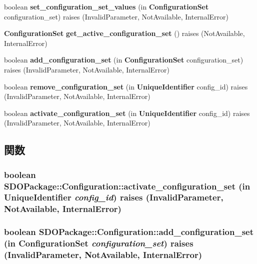 \begin{DoxyCompactItemize}
\item 
boolean {\bf set\_\-configuration\_\-set\_\-values} (in {\bf ConfigurationSet} configuration\_\-set)  raises (InvalidParameter, NotAvailable, InternalError)
\item 
{\bf ConfigurationSet} {\bf get\_\-active\_\-configuration\_\-set} ()  raises (NotAvailable, InternalError)
\item 
boolean {\bf add\_\-configuration\_\-set} (in {\bf ConfigurationSet} configuration\_\-set)  raises (InvalidParameter, NotAvailable, InternalError)
\item 
boolean {\bf remove\_\-configuration\_\-set} (in {\bf UniqueIdentifier} config\_\-id)  raises (InvalidParameter, NotAvailable, InternalError)
\item 
boolean {\bf activate\_\-configuration\_\-set} (in {\bf UniqueIdentifier} config\_\-id)  raises (InvalidParameter, NotAvailable, InternalError)
\end{DoxyCompactItemize}


\subsection{関数}
\subsubsection[{activate\_\-configuration\_\-set}]{\setlength{\rightskip}{0pt plus 5cm}boolean SDOPackage::Configuration::activate\_\-configuration\_\-set (in {\bf UniqueIdentifier} {\em config\_\-id})  raises (InvalidParameter, NotAvailable, InternalError)}\label{interfaceSDOPackage_1_1Configuration_a328e38e1fa5acd4fb27b1a99912a4923}
\subsubsection[{add\_\-configuration\_\-set}]{\setlength{\rightskip}{0pt plus 5cm}boolean SDOPackage::Configuration::add\_\-configuration\_\-set (in {\bf ConfigurationSet} {\em configuration\_\-set})  raises (InvalidParameter, NotAvailable, InternalError)}\label{interfaceSDOPackage_1_1Configuration_a04a066acc0585d940c058a6fc34f5023}

